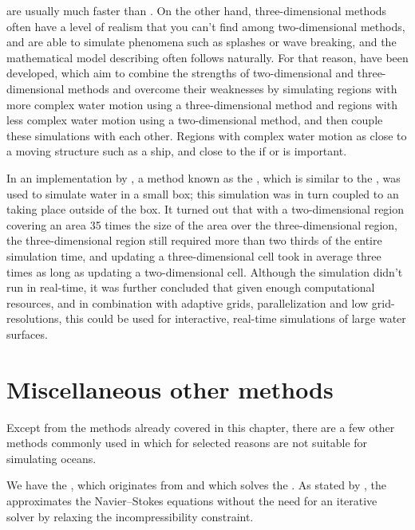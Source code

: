  are usually much faster than . On the other hand, three-dimensional methods often have a level of realism that you can't find among two-dimensional methods, and are able to simulate phenomena such as splashes or wave breaking, and the mathematical model describing \FSI often follows naturally. For that reason,  have been developed, which aim to combine the strengths of two-dimensional and three-dimensional methods and overcome their weaknesses by simulating regions with more complex water motion using a three-dimensional method and regions with less complex water motion using a two-dimensional method, and then couple these simulations with each other. Regions with complex water motion as close to a moving structure such as a ship, and close to the \shoreline if  or  is important.

In an implementation by \citet{Thurey2006}, a method known as the , which is similar to the \FVM, was used to simulate water in a small box; this simulation was in turn coupled to an \SWS taking place outside of the box. It turned out that with a two-dimensional region covering an area 35 times the size of the area over the three-dimensional region, the three-dimensional region still required more than two thirds of the entire simulation time, and updating a three-dimensional cell took in average three times as long as updating a two-dimensional cell. Although the simulation didn't run in real-time, it was further concluded that given enough computational resources, and in combination with adaptive grids, parallelization and low grid-resolutions, this could be used for interactive, real-time simulations of large water surfaces.

\section{Miscellaneous other methods}

Except from the methods already covered in this chapter, there are a few other methods commonly used in \CFD which for selected reasons are not suitable for simulating oceans.

We have the \LBM, which originates from  and which solves the . As stated by \citet{Thurey2006}, the \LBM approximates the Navier--Stokes equations without the need for an iterative solver by relaxing the incompressibility constraint.

